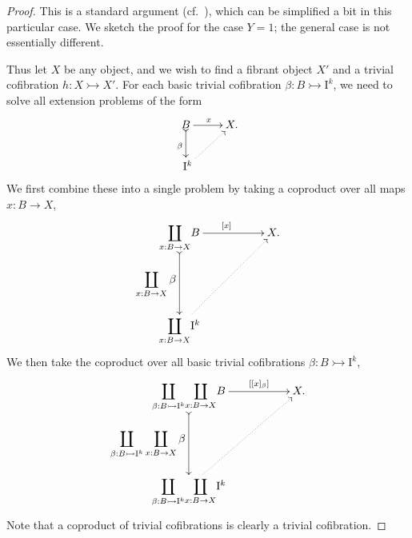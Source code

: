 \documentclass[11pt]{article}
\newcommand{\mono}{\ensuremath{\rightarrowtail}}
\newcommand{\ra}{\ensuremath{\rightarrow}}
\newcommand{\I}{\ensuremath{\mathrm{I}}}
\theoremstyle{remark}
\theoremstyle{definition}
\begin{document}
\begin{proof}
This is a standard argument (cf.~\cite{Quillen,Garner}), which can be simplified a bit in this particular case.  We sketch the proof for the case $Y=1$; the general case is not essentially different.

Thus let $X$ be any object, and we wish to find a fibrant object $X'$ and a trivial cofibration $h : X\mono X'$.
For each basic trivial cofibration $\beta : B\mono \I^{k}$, we need to solve all extension problems of the form
\begin{equation}\label{diagram:extensionforX}
\xymatrix{
B \ar@{>->}[d]_{\beta} \ar[r]^x & X.\\
\ \I^{k} \ar@{..>}[ru]&
}
\end{equation}
We first combine these into a single problem by taking a coproduct over all maps $x : B\ra X$,
\begin{equation*}%
\xymatrix{
{{\displaystyle\coprod_{x: B\ra X}} B} {\ar@{>->}[dd]_-{\displaystyle\coprod_{x: B\ra X}\beta}} {\ar[rr]^{[x]}} && X.\\
&&\\
{{\displaystyle\coprod_{x: B\ra X}} \I^{k}} {\ar@{..>}[rruu]} &&
}
\end{equation*}
%
We then take the coproduct over all basic trivial cofibrations $\beta : B\mono \I^k$,
\begin{equation*}%
\xymatrix{
{\displaystyle\coprod_{\beta: B\mono\I^k}} {{\displaystyle\coprod_{x: B\ra X}} B} {\ar@{>->}[dd]_-{{\displaystyle\coprod_{\beta: B\mono\I^k}} \displaystyle\coprod_{x: B\ra X}\beta}} {\ar[rr]^-{[[x]_\beta]}} && X.\\
&&\\
{\displaystyle\coprod_{\beta: B\mono\I^k}} {{\displaystyle\coprod_{x: B\ra X}} \I^{k}} {\ar@{..>}[rruu]} &&
}
\end{equation*}
Note that a coproduct of trivial cofibrations is clearly a trivial cofibration. 


\end{proof}
\end{document}
